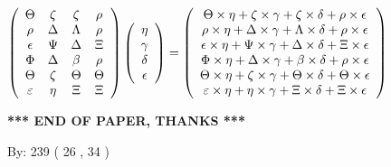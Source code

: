 \documentclass[12pt]{article}
\begin{document}
$  %
 \left( \begin{array}
 {
 c
 c
 c
 c
 }
 \Theta & 
                    \zeta & 
                    \zeta & 
 \rho \\ 
 \rho & 
 \Delta & 
 \Lambda & 
 \rho \\ 
 \epsilon & 
 \Psi & 
 \Delta & 
                    \Xi \\ 
 \Phi & 
 \Delta & 
 \beta & 
 \rho \\ 
 \Theta & 
                    \zeta & 
 \Theta & 
 \Theta \\ 
 \varepsilon & 
 \eta & 
                    \Xi & 
                    \Xi
 \end{array} \right)
 \left( \begin{array}
 {
 c
 }
 \eta \\ 
 \gamma \\ 
 \delta \\ 
 \epsilon
 \end{array} \right)
=
 \left( \begin{array}
 {
 c
 }
  \Theta \times  \eta +                     \zeta \times  \gamma +                     \zeta \times  \delta +  \rho \times  \epsilon \\ 
  \rho \times  \eta +  \Delta \times  \gamma +  \Lambda \times  \delta +  \rho \times  \epsilon \\ 
  \epsilon \times  \eta +  \Psi \times  \gamma +  \Delta \times  \delta +                     \Xi \times  \epsilon \\ 
  \Phi \times  \eta +  \Delta \times  \gamma +  \beta \times  \delta +  \rho \times  \epsilon \\ 
  \Theta \times  \eta +                     \zeta \times  \gamma +  \Theta \times  \delta +  \Theta \times  \epsilon \\ 
  \varepsilon \times  \eta +  \eta \times  \gamma +                     \Xi \times  \delta +                     \Xi \times  \epsilon
 \end{array} \right)
$
 
 
 
   
   
 \vspace{0.2in}
 
   
   
   
   
\vspace{1.0in} 
{\textbf{\large{ *** END OF PAPER, THANKS *** }}} 
   
   
\hspace{1.0in} By: 
         239 (          26 ,           34 )
   
\end{document}
